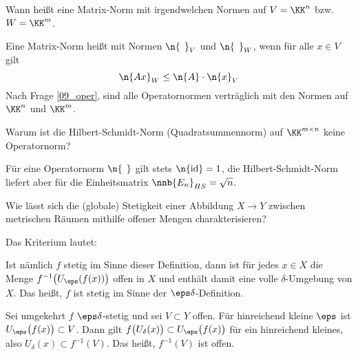 \begin{frage}
  Wann heißt eine Matrix-Norm  mit irgendwelchen 
  Normen auf $V=\KK^n$ bzw. $W=\KK^m$.
\end{frage}


\begin{antwort}
  Eine Matrix-Norm heißt  mit Normen $\n{\,\;}_V$ und 
  $\n{\;\,}_W$, wenn für alle $x\in V$ gilt 
  \begin{equation}
    \n{ Ax }_W \le \n{ A } \cdot \n{ x }_V
    \notag
  \end{equation}
  Nach Frage \ref{09_oper},  sind {\zB} alle Operatornormen 
  verträglich mit den Normen auf $\KK^n$ und $\KK^m$. 
  \AntEnd 
\end{antwort}


\begin{frage}
  Warum ist die Hilbert-Schmidt-Norm 
  (Quadratsummennorm) auf $\KK^{m\times n}$ keine 
  Operatornorm?
\end{frage}


\begin{antwort}
  Für eine Operatornorm $\n{\;\,}$ gilt stets $\n{\mathrm{id}}=1$, 
  die Hilbert-Schmidt-Norm liefert aber für die Einheitsmatrix 
  $\nnb{ E_n }_{HS} = \sqrt{n}$.
  \AntEnd 
\end{antwort}


\begin{frage}\label{09_globstet}
  Wie lässt sich die (globale) Stetigkeit einer Abbildung 
  $X\to Y$ zwischen metrischen Räumen mithilfe offener Mengen 
  charakterisieren?
\end{frage}

\begin{antwort}
  Das Kriterium lautet:


  \medskip\noindent%


  \medskip\noindent
  Ist nämlich $f$ stetig im Sinne dieser Definition, dann ist für 
  jedes $x\in X$ die Menge $f^{-1} \big( U_\eps(f(x))\big)$ offen in 
  $X$ und enthält damit eine volle $\delta$-Umgebung von $X$. Das heißt, 
  $f$ ist stetig im Sinne der $\eps\delta$-Definition.

  Sei umgekehrt $f$ $\eps\delta$-stetig und sei $V\subset Y$ offen. 
  Für hinreichend kleine $\eps$ ist $U_\eps\big( f(x) \big) \subset V$.  
  Dann gilt $f\big( U_\delta(x) \big ) \subset  
  U_\eps\big( f(x) \big)$ für ein hinreichend kleines, also 
  $U_\delta (x) \subset f^{-1}(V)$. Das heißt, $f^{-1}(V)$ ist offen.  
  \AntEnd 
\end{antwort} 





